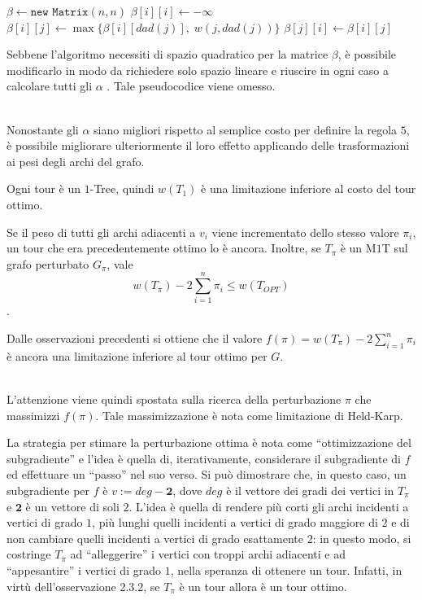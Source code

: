 \begin{algorithm}[H]
\caption{}
\begin{algorithmic}
    \State $\beta \gets \texttt{new Matrix}(n, n)$
        \State $\beta[i][i] \gets -\infty$
            \State $\beta[i][j] \gets \max\big\{\beta[i][dad(j)],\; w(j, dad(j))\big\}$
            \State $\beta[j][i] \gets \beta[i][j]$
        \EndFor
    \EndFor
\EndFunction
\end{algorithmic}
\end{algorithm}

Sebbene l'algoritmo necessiti di spazio quadratico per la matrice $\beta$, è possibile modificarlo 
in modo da richiedere solo spazio lineare e riuscire in ogni caso a calcolare tutti gli $\alpha$ \cite{LKH}.
Tale pseudocodice viene omesso.

\ \\
Nonostante gli $\alpha$ siano migliori rispetto al semplice costo per definire la regola $5$, è possibile 
migliorare ulteriormente il loro effetto applicando delle trasformazioni ai pesi degli archi del grafo.
\begin{observation}
    Ogni tour è un $1$-Tree, quindi $w(T_1)$ è una limitazione inferiore al costo del tour ottimo.
\end{observation}
\begin{observation}
    Se il peso di tutti gli archi adiacenti a $v_i$ viene incrementato dello stesso valore $\pi_i$, un 
    tour che era precedentemente ottimo lo è ancora. Inoltre, se $T_{\pi}$ è un M$1$T sul grafo perturbato 
    $G_{\pi}$, vale $$w(T_{\pi}) - 2\displaystyle\sum_{i=1}^{n}{\pi_i} \leq w(T_{OPT})$$.
\end{observation}
\begin{observation}
    Dalle osservazioni precedenti si ottiene che il valore $f(\pi) = w(T_{\pi}) - 2\displaystyle\sum_{i=1}^{n}{\pi_i}$ 
    è ancora una limitazione inferiore al tour ottimo per $G$.
\end{observation}
\ \\
L'attenzione viene quindi spostata sulla ricerca della perturbazione $\pi$ che massimizzi $f(\pi)$. Tale 
massimizzazione è nota come limitazione di Held-Karp.

La strategia per stimare la perturbazione ottima è nota come ``ottimizzazione del subgradiente'' e l'idea 
è quella di, iterativamente, considerare il subgradiente di $f$ ed effettuare un ``passo'' nel suo verso. 
Si può dimostrare che, in questo caso, un subgradiente per $f$ è $v := deg - \mathbf{2}$, dove $deg$ è il 
vettore dei gradi dei vertici in $T_{\pi}$ e $\mathbf{2}$ è un vettore di soli $2$. L'idea è quella di rendere 
più corti gli archi incidenti a vertici di grado $1$, più lunghi quelli incidenti a vertici di grado maggiore 
di $2$ e di non cambiare quelli incidenti a vertici di grado esattamente $2$: in questo modo, si costringe 
$T_{\pi}$ ad ``alleggerire'' i vertici con troppi archi adiacenti e ad ``appesantire'' i vertici di grado $1$,
nella speranza di ottenere un tour. Infatti, in virtù dell'osservazione 2.3.2, se $T_{\pi}$ è un tour allora è 
un tour ottimo.

